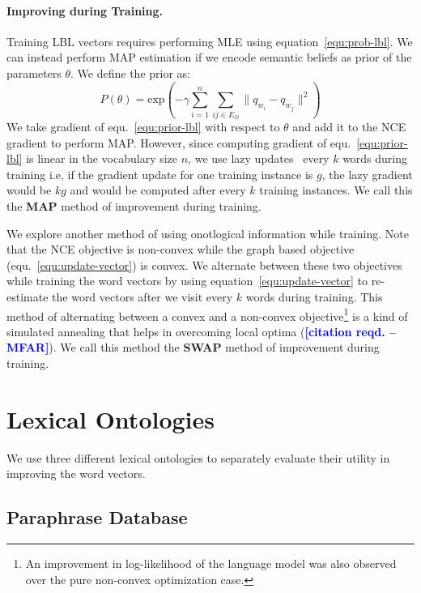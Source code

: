 \documentclass[11pt]{article}
\newcommand{\mfar}[1]{\textcolor{blue}{\bf\small [#1 --MFAR]}}
\begin{document}
\paragraph{Improving during Training.} Training LBL vectors requires performing MLE 
using equation~\ref{equ:prob-lbl}. We can instead perform MAP estimation
if we encode semantic beliefs as prior of the parameters $\theta$. We define the prior
as:
\begin{equation}
  \label{equ:prior-lbl}
  P(\theta) = \text{exp}(-\gamma\sum_{i=1}^{n}\sum_{ij \in E_{\Omega}}\lVert q_{w_i}-q_{w_j} \rVert^{2})
\end{equation}
We take gradient of equ.~\ref{equ:prior-lbl} with respect to $\theta$ and add it to the 
NCE gradient to perform MAP. However, since computing gradient of equ.~\ref{equ:prior-lbl}
is linear in the vocabulary size $n$, we use lazy updates~\cite{Carpenter08lazysparse} every
$k$ words during training i.e, if the gradient update for one training instance is $g$, the
lazy gradient would be $kg$ and would be computed after every $k$ training instances.
We call this the \textbf{MAP} method of improvement during training.

We explore another method of using onotlogical information while training.
Note that the NCE objective is non-convex while the graph based objective 
(equ.~\ref{equ:update-vector}) is 
convex. We alternate between these two objectives while training the word vectors by
using equation~\ref{equ:update-vector} to re-estimate the word vectors after we visit every 
$k$ words during training. This method of alternating between a convex and a non-convex
objective\footnote{An improvement in log-likelihood of the language model was also observed over the 
pure non-convex optimization case.} is a kind of simulated annealing that helps in overcoming 
local optima (\mfar{citation reqd.}). We call this method the \textbf{SWAP} method of improvement during training.

\section{Lexical Ontologies}
\label{sec:onto}

We use three different lexical ontologies to separately evaluate their utility in improving
the word vectors.

\subsection{Paraphrase Database} 
\label{sec:ppdb}
\end{document}
